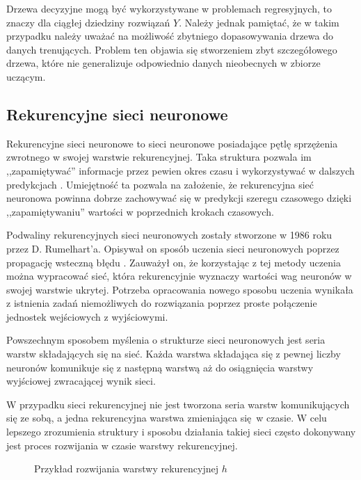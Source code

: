 \documentclass[10pt,a4paper]{article}
\begin{document}
Drzewa decyzyjne mogą być wykorzystywane w problemach regresyjnych, to znaczy dla ciągłej dziedziny rozwiązań $Y$. Należy jednak pamiętać, że w takim przypadku  należy uważać na możliwość zbytniego dopasowywania drzewa do danych trenujących. Problem ten objawia się stworzeniem zbyt szczegółowego drzewa, które nie generalizuje odpowiednio danych nieobecnych w zbiorze uczącym.

\subsection{Rekurencyjne sieci neuronowe}
\label{subsection:introduction:simpleRNN}
Rekurencyjne sieci neuronowe to sieci neuronowe posiadające pętlę sprzężenia zwrotnego w swojej warstwie rekurencyjnej. Taka struktura pozwala im ,,zapamiętywać'' informacje przez pewien okres czasu i wykorzystywać w dalszych predykcjach \cite{reviewOfANN2018}. Umiejętność ta pozwala na założenie, że rekurencyjna sieć neuronowa powinna dobrze zachowywać się w predykcji szeregu czasowego dzięki ,,zapamiętywaniu'' wartości w poprzednich krokach czasowych. 

Podwaliny rekurencyjnych sieci neuronowych zostały stworzone w 1986 roku przez D. Rumelhart'a. Opisywał on sposób uczenia sieci neuronowych poprzez propagację wsteczną błędu \cite{rumelhart1986learning}. Zauważył on, że korzystając z tej metody uczenia można wypracować sieć, która rekurencyjnie wyznaczy wartości wag neuronów w swojej warstwie ukrytej. Potrzeba opracowania nowego sposobu uczenia wynikała z istnienia zadań niemożliwych do rozwiązania poprzez proste połączenie jednostek wejściowych z wyjściowymi.

Powszechnym sposobem myślenia o strukturze sieci neuronowych jest seria warstw składających się na sieć. Każda warstwa składająca się z pewnej liczby neuronów komunikuje się z następną warstwą aż do osiągnięcia warstwy wyjściowej zwracającej wynik sieci. 

W przypadku sieci rekurencyjnej nie jest tworzona seria warstw komunikujących się ze sobą, a jedna rekurencyjna warstwa zmieniająca się w czasie. W celu lepszego zrozumienia struktury i sposobu działania takiej sieci często dokonywany jest proces rozwijania w czasie warstwy rekurencyjnej.

\begin{figure}[!ht]
	\centering
	\caption{Przykład rozwijania warstwy rekurencyjnej $h$}
	\label{figure:unfolded_rnn}
\end{figure}
\FloatBarrier
\end{document}
